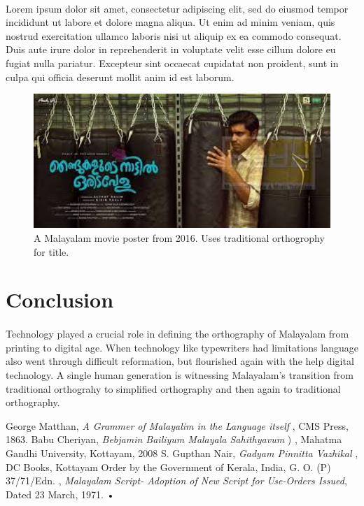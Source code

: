 \documentclass[10pt]{article}
\begin{document}
\paragraph{}
Lorem ipsum dolor sit amet, consectetur adipiscing elit, sed do eiusmod tempor incididunt ut labore et dolore magna aliqua. Ut enim ad minim veniam, quis nostrud exercitation ullamco laboris nisi ut aliquip ex ea commodo consequat. Duis aute irure dolor in reprehenderit in voluptate velit esse cillum dolore eu fugiat nulla pariatur. Excepteur sint occaecat cupidatat non proident, sunt in culpa qui officia deserunt mollit anim id est laborum.


\begin{figure}[h!]
 \centering
  \includegraphics[width=1.0\textwidth]{images/2017-movieposter-njandukalude}
 \caption{A Malayalam movie poster from 2016. Uses traditional orthogrophy for title.}
\end{figure}

\section{Conclusion}

\paragraph{}
Technology played a crucial role in defining the orthography of Malayalam from printing to digital age. When technology like typewriters had limitations language also went through difficult reformation, but flourished again with the help digital technology. A single human generation is witnessing Malayalam's transition from traditional orthograhy to simplified orthography and then again to traditional orthography.

\begin{thebibliography}{9}
 George Matthan, \textit{A Grammer of Malayalim in the Language itself }, CMS Press, 1863.
 Babu Cheriyan, \textit{Bebjamin Bailiyum Malayala Sahithyavum} {) }, Mahatma Gandhi University, Kottayam, 2008
 S. Gupthan Nair, \textit{Gadyam Pinnitta Vazhikal}{ }, DC Books, Kottayam
 Order by the Government of Kerala, India, G. O. (P) 37/71/Edn. , \textit{Malayalam Script- Adoption of New Script for Use-Orders Issued}, Dated 23 March, 1971.
•


\end{thebibliography}
\end{document}
